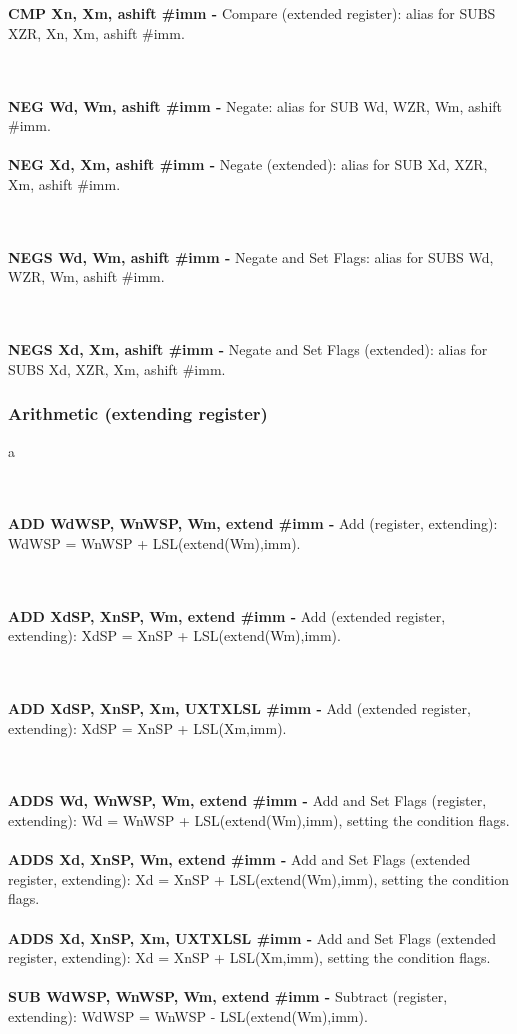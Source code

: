 \documentclass[12pt,a4paper,utf8]{ppgsi}
\begin{document}
\\\\\textbf{CMP Xn, Xm{, ashift \#imm} -} Compare (extended register): alias for SUBS XZR, Xn, Xm{, ashift \#imm}. 

\\\\\textbf{NEG Wd, Wm{, ashift \#imm} -} Negate: alias for SUB Wd, WZR, Wm{, ashift \#imm}. 
\\\\\textbf{NEG Xd, Xm{, ashift \#imm} -} Negate (extended): alias for SUB Xd, XZR, Xm{, ashift \#imm}. 

\\\\\textbf{NEGS Wd, Wm{, ashift \#imm} -} Negate and Set Flags: alias for SUBS Wd, WZR, Wm{, ashift \#imm}. 

\\\\\textbf{NEGS Xd, Xm{, ashift \#imm} -} Negate and Set Flags (extended): alias for SUBS Xd, XZR, Xm{, ashift \#imm}. 



\subsubsection{Arithmetic (extending register)}
a

\\\\\textbf{ADD Wd\textbar WSP, Wn\textbar WSP, Wm, extend {#imm} -} Add (register, extending): Wd\textbar WSP = Wn\textbar WSP + LSL(extend(Wm),imm). 

\\\\\textbf{ADD Xd\textbar SP, Xn\textbar SP, Wm, extend {#imm} -} Add (extended register, extending): Xd\textbar SP = Xn\textbar SP + LSL(extend(Wm),imm). 

\\\\\textbf{ADD Xd\textbar SP, Xn\textbar SP, Xm{, UXTX\textbar LSL \#imm} -} Add (extended register, extending): Xd\textbar SP = Xn\textbar SP + LSL(Xm,imm). 

\\\\\textbf{ADDS Wd, Wn\textbar WSP, Wm, extend {#imm} -} Add and Set Flags (register, extending): Wd = Wn\textbar WSP + LSL(extend(Wm),imm), setting the
condition flags. 
\\\\\textbf{ADDS Xd, Xn\textbar SP, Wm, extend {#imm} -} Add and Set Flags (extended register, extending): Xd = Xn\textbar SP + LSL(extend(Wm),imm), setting
the condition flags. 
\\\\\textbf{ADDS Xd, Xn\textbar SP, Xm{, UXTX\textbar LSL \#imm} -} Add and Set Flags (extended register, extending): Xd = Xn\textbar SP + LSL(Xm,imm), setting the condition
flags. 
\\\\\textbf{SUB Wd\textbar WSP, Wn\textbar WSP, Wm, extend {#imm} -} Subtract (register, extending): Wd\textbar WSP = Wn\textbar WSP - LSL(extend(Wm),imm).
\end{document}
